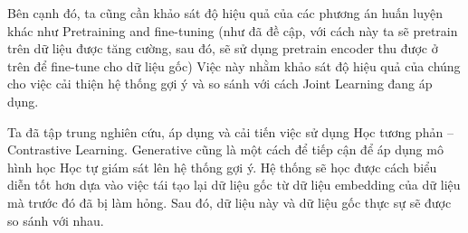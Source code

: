 Bên cạnh đó, ta cũng cần khảo sát độ hiệu quả của các phương án huấn luyện khác như Pretraining and fine-tuning (như đã đề cập, với cách này ta sẽ pretrain trên dữ liệu được tăng cường, sau đó, sẽ sử dụng pretrain encoder thu được ở trên để fine-tune cho dữ liệu gốc) Việc này nhằm khảo sát độ hiệu quả của chúng cho việc cải thiện hệ thống gợi ý và so sánh với cách Joint Learning đang áp dụng.

Ta đã tập trung nghiên cứu, áp dụng và cải tiến việc sử dụng Học tương phản -- Contrastive Learning. Generative cũng là một cách để tiếp cận để áp dụng mô hình học Học tự giám sát lên hệ thống gợi ý. Hệ thống sẽ học được cách biểu diễn tốt hơn dựa vào việc tái tạo lại dữ liệu gốc từ dữ liệu embedding của dữ liệu mà trước đó đã bị làm hỏng. Sau đó, dữ liệu này và dữ liệu gốc thực sự sẽ được so sánh với nhau.


